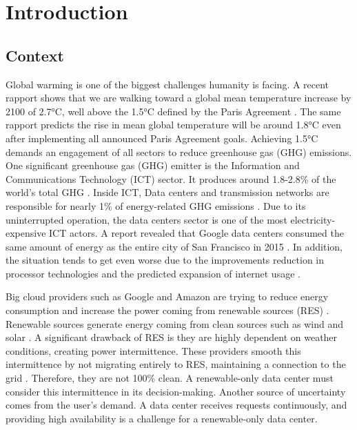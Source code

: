 \chapter{Introduction}
\label{cha:introduction}


\section{Context}

Global warming is one of the biggest challenges humanity is facing. A recent rapport shows that we are walking toward a global mean temperature increase by 2100 of 2.7°C, well above the 1.5°C defined by the Paris Agreement \cite{tracker2022massive}. The same rapport predicts the rise in mean global temperature will be around 1.8°C even after implementing all announced Paris Agreement goals. Achieving 1.5°C demands an engagement of all sectors to reduce greenhouse gas (GHG) emissions. One significant greenhouse gas (GHG) emitter is the Information and Communications Technology (ICT) sector. It produces around 1.8-2.8\% of the world's total GHG \cite{freitag2021climate}. Inside ICT, Data centers and transmission networks are responsible for nearly 1\% of energy-related GHG emissions \cite{centres2022data}. Due to its uninterrupted operation, the data centers sector is one of the most electricity-expensive ICT actors. A report revealed that Google data centers consumed the same amount of energy as the entire city of San Francisco in 2015 \cite{khan2018exploiting}. In addition, the situation tends to get even worse due to the improvements reduction in processor technologies and the predicted expansion of internet usage \cite{cisco2020cisco, freitag2021climate}.

Big cloud providers such as Google and Amazon are trying to reduce energy consumption and increase the power coming from renewable sources (RES) \cite{Masanet984}. Renewable sources generate energy coming from clean sources such as wind and solar \cite{rostirolla2022survey}. A significant drawback of RES is they are highly dependent on weather conditions, creating power intermittence. These providers smooth this intermittence by not migrating entirely to RES, maintaining a connection to the grid \cite{rostirolla2022survey}. Therefore, they are not 100\% clean. A renewable-only data center must consider this intermittence in its decision-making. Another source of uncertainty comes from the user's demand. A data center receives requests continuously, and providing high availability is a challenge for a renewable-only data center.

